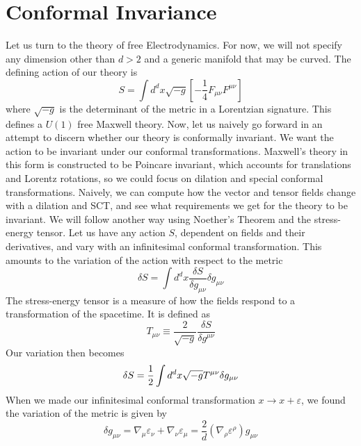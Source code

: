 \documentclass{article}
\begin{document}
\section{Conformal Invariance}
Let us turn to the theory of free Electrodynamics. For now, we will not specify any dimension other than $d>2$ and a generic manifold that may be curved. The defining action of our theory is 
\begin{equation}
    S = \int d^dx\sqrt{-g}\left[-\frac{1}{4} F_{\mu\nu}F^{\mu\nu}\right]
\end{equation}
where $\sqrt{-g}$ is the determinant of the metric in a Lorentzian signature. This defines a $U(1)$ free Maxwell theory. Now, let us naively go forward in an attempt to discern whether our theory is conformally invariant. We want the action to be invariant under our conformal transformations. Maxwell's theory in this form is constructed to be Poincare invariant, which accounts for translations and Lorentz rotations, so we could focus on dilation and special conformal transformations. Naively, we can compute how the vector and tensor fields change with a dilation and SCT, and see what requirements we get for the theory to be invariant. We will follow another way using Noether's Theorem and the stress-energy tensor. Let us have any action $S$, dependent on fields and their derivatives, and vary with an infinitesimal conformal transformation. This amounts to the variation of the action with respect to the metric
\begin{equation}
    \delta S = \int d^dx\frac{\delta S}{\delta g_{\mu\nu}}\delta g _{\mu\nu} 
\end{equation}
The stress-energy tensor is a measure of how the fields respond to a transformation of the spacetime. It is defined as
\begin{equation}
    T_{\mu\nu} \equiv \frac{2}{\sqrt{-g}}\frac{\delta S}{\delta g^{\mu\nu}}
\end{equation}
Our variation then becomes
\begin{equation}
    \delta S = \frac{1}{2}\int d^dx \sqrt{-g}\space T^{\mu\nu}\delta g_{\mu\nu} 
\end{equation}
When we made our infinitesimal conformal transformation $x \longrightarrow x + \varepsilon$, we found the variation of the metric is given by
\begin{equation}
    \delta g_{\mu\nu} = \nabla_\mu \varepsilon_\nu + \nabla_\nu\varepsilon_\mu = \frac{2}{d}\left(\nabla_\rho\varepsilon^\rho\right) g _{\mu\nu}
\end{equation}
\end{document}
